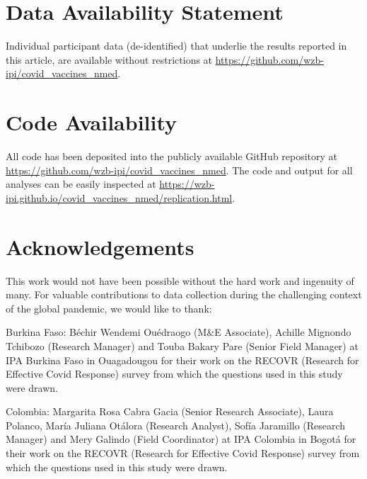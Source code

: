 \documentclass[
  12pt,
]{article}
\begin{document}
\newpage

\hypertarget{data-availability-statement}{%
\section*{Data Availability Statement}\label{data-availability-statement}}

Individual participant data (de-identified) that underlie the results reported in this article, are available without restrictions at \url{https://github.com/wzb-ipi/covid_vaccines_nmed}.

\hypertarget{code-availability}{%
\section*{Code Availability}\label{code-availability}}

All code has been deposited into the publicly available GitHub repository at \url{https://github.com/wzb-ipi/covid_vaccines_nmed}. The code and output for all analyses can be easily inspected at \url{https://wzb-ipi.github.io/covid_vaccines_nmed/replication.html}.

\hypertarget{acknowledgements}{%
\section*{Acknowledgements}\label{acknowledgements}}

This work would not have been possible without the hard work and ingenuity of many. For valuable contributions to data collection during the challenging context of the global pandemic, we would like to thank:

Burkina Faso: Béchir Wendemi Ouédraogo (M\&E Associate), Achille Mignondo Tchibozo (Research Manager) and Touba Bakary Pare (Senior Field Manager) at IPA Burkina Faso in Ouagadougou for their work on the RECOVR (Research for Effective Covid Response) survey from which the questions used in this study were drawn.

Colombia: Margarita Rosa Cabra Gacia (Senior Research Associate), Laura Polanco, María Juliana Otálora (Research Analyst), Sofía Jaramillo (Research Manager) and Mery Galindo (Field Coordinator) at IPA Colombia in Bogotá for their work on the RECOVR (Research for Effective Covid Response) survey from which the questions used in this study were drawn.
\end{document}
